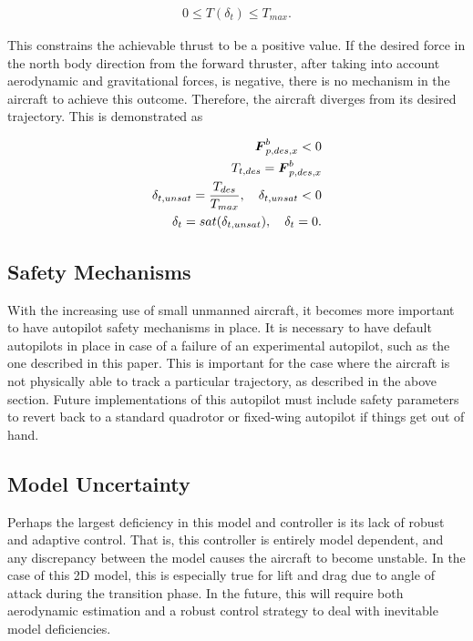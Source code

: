 \begin{align}
    0 \leq T(\delta_t) \leq T_{max}.
\end{align}

This constrains the achievable thrust to be a positive value. 
If the desired force in the north body direction from the forward thruster, after taking into account aerodynamic and gravitational forces, is negative, there is no mechanism in the aircraft to achieve this outcome. 
Therefore, the aircraft diverges from its desired trajectory. 
This is demonstrated as

\begin{align}
    \boldsymbol{F}^b_{p,des,x} < 0\\
    T_{t,des} = \boldsymbol{F}^b_{p,des,x}\\
    \delta_{t,unsat} = \frac{T_{des}}{T_{max}}, \quad \delta_{t,unsat} < 0\\
    \delta_t = sat(\delta_{t,unsat}), \quad \delta_t = 0.
\end{align}

\subsection{Safety Mechanisms}

With the increasing use of small unmanned aircraft, it becomes more important to have autopilot safety mechanisms in place. 
It is necessary to have default autopilots in place in case of a failure of an experimental autopilot, such as the one described in this paper. 
This is important for the case where the aircraft is not physically able to track a particular trajectory, as described in the above section. 
Future implementations of this autopilot must include safety parameters to revert back to a standard quadrotor or fixed-wing autopilot if things get out of hand.

\subsection{Model Uncertainty}

Perhaps the largest deficiency in this model and controller is its lack of robust and adaptive control. 
That is, this controller is entirely model dependent, and any discrepancy between the model causes the aircraft to become unstable.
In the case of this 2D model, this is especially true for lift and drag due to angle of attack during the transition phase.
In the future, this will require both aerodynamic estimation and a robust control strategy to deal with inevitable model deficiencies.

